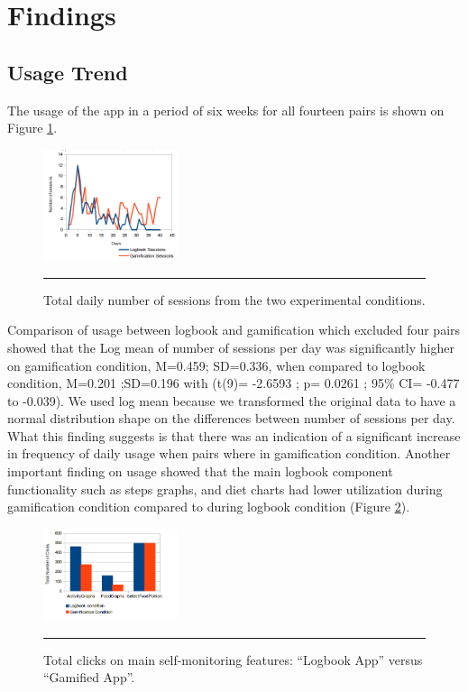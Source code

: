 \documentclass{sig-alternate}
\begin{document}
\section{Findings}
\subsection{Usage Trend} 
The usage of the app in a period of six weeks for all fourteen pairs is shown on Figure \ref{figure:usagedailysessions}.
\begin{figure}[htbp]
  \centering
    \includegraphics[width=0.35\textwidth]{scatter_daily_sessions.png}
    \rule{26em}{0.5pt}
  \caption{Total daily number of sessions from the two experimental conditions.}
  \label{figure:usagedailysessions}
\end{figure} 
Comparison of usage between logbook and gamification which excluded four pairs showed that the Log mean of number of sessions per day was significantly higher on gamification condition, M=0.459; SD=0.336, when compared to logbook condition, M=0.201 ;SD=0.196 with (t(9)= -2.6593 ; p= 0.0261 ; 95\% CI=  -0.477 to -0.039). We used log mean because we transformed the original data to have a normal distribution shape on the differences between number of sessions per day. What this finding suggests is that there was an indication of a significant increase in frequency of daily usage when pairs where in gamification condition.\newline
Another important finding on usage showed that the main logbook component functionality such as steps graphs, and diet charts had lower utilization during gamification condition compared to during logbook condition (Figure \ref{figure:self_monitoring_usage}).
\begin{figure}[htbp]
  \centering
    \includegraphics[width=0.35\textwidth]{self_monitoring_usage.png}
    \rule{26em}{0.5pt}
  \caption{Total clicks on main self-monitoring features: ``Logbook App'' versus ``Gamified App''.}
  \label{figure:self_monitoring_usage}
\end{figure}\newline
\end{document}
